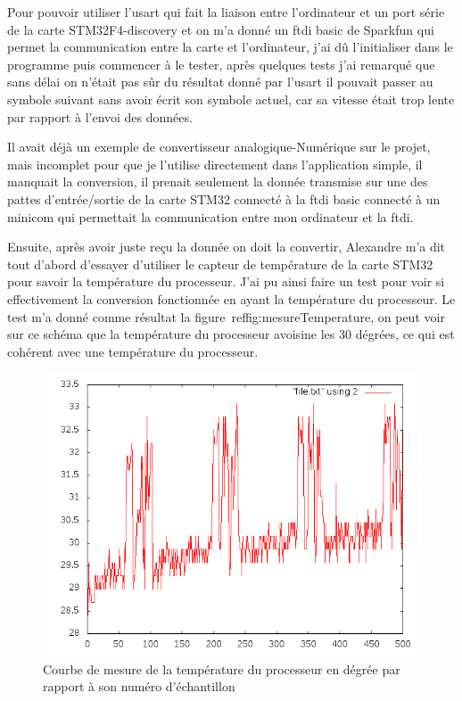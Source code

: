 \documentclass[a4paper]{article}
\begin{document}
Pour pouvoir utiliser l'usart qui fait la liaison entre l'ordinateur et un port série de la carte STM32F4-discovery et on m'a donné un ftdi basic de Sparkfun qui permet la communication entre la carte et l'ordinateur, j'ai dû l'initialiser dans le programme puis commencer à le tester, après quelques tests j'ai remarqué que sans délai on n'était pas sûr du résultat donné par l'usart il pouvait passer au symbole suivant sans avoir écrit son symbole actuel, car sa vitesse était trop lente par rapport à l'envoi des données.

Il avait déjà un exemple de convertisseur analogique-Numérique sur le projet, mais incomplet pour que je l'utilise directement dans l'application simple, il manquait la conversion, il prenait seulement la donnée transmise sur une des pattes d'entrée/sortie de la carte STM32 connecté à la ftdi basic connecté à un minicom qui permettait la communication entre mon ordinateur et la ftdi.

Ensuite, après avoir juste reçu la donnée on doit la convertir, Alexandre m'a dit tout d'abord d'essayer d'utiliser le capteur de température de la carte STM32 pour savoir la température du processeur. J'ai pu ainsi faire un test pour voir si effectivement la conversion fonctionnée en ayant la température du processeur. Le test m'a donné comme résultat la figure~ref{fig:mesureTemperature}, on peut voir sur ce schéma que la température du processeur avoisine les 30 dégrées, ce qui est cohérent avec une température du processeur. 

\begin{figure}[H]
\centering
\includegraphics[width=1\textwidth]{test_temp.png}
\caption{\label{fig:mesureTemperature}Courbe de mesure de la température du processeur en dégrée par rapport à son numéro d'échantillon}
\end{figure}
\end{document}
